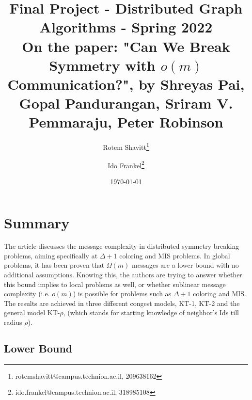 \documentclass[11pt]{article}
\begin{document}
\title{Final Project - Distributed Graph Algorithms - Spring 2022\\
On the paper: "Can We Break Symmetry with $o(m)$ Communication?", by Shreyas Pai, Gopal Pandurangan, Sriram V. Pemmaraju, Peter Robinson
}
\author{Rotem Shavitt\footnote{rotemshavitt@campus.technion.ac.il, 209638162} \and Ido Frankel\footnote{ido.frankel@campus.technion.ac.il, 318985108}
}
\date{\today}
\maketitle

\section{Summary}

The article discusses the message complexity in distributed symmetry breaking problems, aiming specifically at $\Delta + 1 $ coloring and MIS problems. In global problems, it has been proven that $\Omega(m)$ messages are a lower bound with no additional assumptions. Knowing this, the authors are trying to answer whether this bound implies to local problems as well, or whether sublinear message complexity (i.e. $o(m)$) is possible for problems such as $\Delta +1$ coloring and MIS. The results are achieved in three different congest models, KT-1, KT-2 and the general model KT-$\rho$, (which stands for starting knowledge of neighbor's Ids till radius $\rho$).

\subsection*{Lower Bound}
\end{document}
